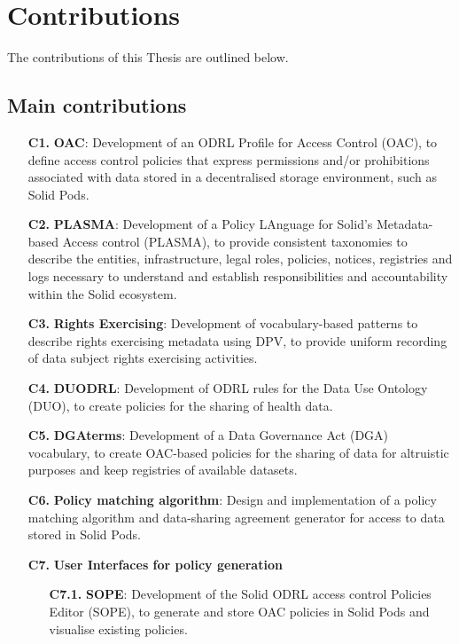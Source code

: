 \section{Contributions}
\label{sec:contributions}

The contributions of this Thesis are outlined below.

\subsection{Main contributions}
\label{sec:contr_main}

\begin{enumerate}
    \item [\textbf{C1.}] \textbf{OAC}: Development of an ODRL Profile for Access Control (OAC), to define access control policies that express permissions and/or prohibitions associated with data stored in a decentralised storage environment, such as Solid Pods.
    \item [\textbf{C2.}] \textbf{PLASMA}: Development of a Policy LAnguage for Solid’s Metadata-based Access control (PLASMA), to provide consistent taxonomies to describe the entities, infrastructure, legal roles, policies, notices, registries and logs necessary to understand and establish responsibilities and accountability within the Solid ecosystem.
    \item [\textbf{C3.}] \textbf{Rights Exercising}: Development of vocabulary-based patterns to describe rights exercising metadata using DPV, to provide uniform recording of data subject rights exercising activities.
    \item [\textbf{C4.}] \textbf{DUODRL}: Development of ODRL rules for the Data Use Ontology (DUO), to create policies for the sharing of health data.
    \item [\textbf{C5.}] \textbf{DGAterms}: Development of a Data Governance Act (DGA) vocabulary, to create OAC-based policies for the sharing of data for altruistic purposes and keep registries of available datasets.
    \item [\textbf{C6.}] \textbf{Policy matching algorithm}: Design and implementation of a policy matching algorithm and data-sharing agreement generator for access to data stored in Solid Pods.
    \item [\textbf{C7.}] \textbf{User Interfaces for policy generation}
    \begin{enumerate}
    \item [\textbf{C7.1.}] \textbf{SOPE}: Development of the Solid ODRL access control Policies Editor (SOPE), to generate and store OAC policies in Solid Pods and visualise existing policies.

\end{enumerate}
\end{enumerate}
